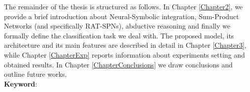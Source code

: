 The remainder of the thesis is structured as follows. In Chapter \ref{Chapter2}, we provide a brief introduction about Neural-Symbolic integration, Sum-Product Networks (and specifically RAT-SPNs), abductive reasoning and finally we formally define the classification task we deal with. The proposed model, its architecture and its main features are described in detail in Chapter \ref{Chapter3}, while Chapter \ref{ChapterExp} reports information about experiments setting and obtained results. In Chapter \ref{ChapterConclusions} we draw conclusions and outline future works. \\

\noindent \textbf{Keyword}: \keywordnames
